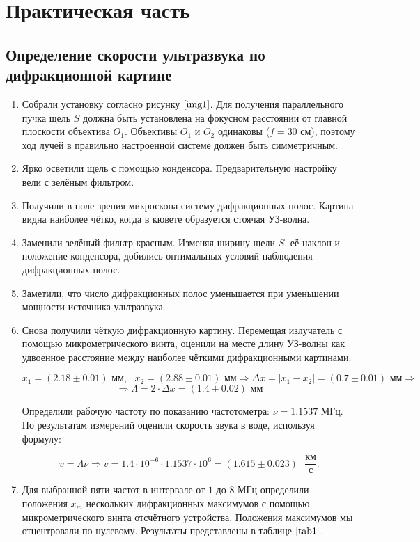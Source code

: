 \documentclass[a4paper,12pt]{article} %
\begin{document}
\section{Практическая часть}

\subsection{Определение скорости ультразвука по дифракционной картине}

\begin{enumerate}
    \item Собрали установку согласно рисунку $\ref{img1}$. Для получения параллельного пучка щель $S$ должна быть установлена на фокусном расстоянии от главной плоскости объектива $O_1$. Объективы $O_1$ и $O_2$ одинаковы ($f=30\text{ см}$), поэтому ход лучей в правильно настроенной системе должен быть симметричным.
    \item Ярко осветили щель с помощью конденсора. Предварительную настройку вели с зелёным фильтром.
    \item Получили в поле зрения микроскопа систему дифракционных полос. Картина видна наиболее чётко, когда в кювете образуется стоячая УЗ-волна.
    \item Заменили зелёный фильтр красным. Изменяя ширину щели $S$, её наклон и положение конденсора, добились оптимальных условий наблюдения дифракционных полос.
    \item Заметили, что число дифракционных полос уменьшается при уменьшении мощности источника ультразвука.
    \item Снова получили чёткую дифракционную картину. Перемещая излучатель с помощью микрометрического винта, оценили на месте длину УЗ-волны как удвоенное расстояние между наиболее чёткими дифракционными картинами.

    \[ x_1 = (2.18\pm0.01)\text{ мм}, \text{ }x_2 = (2.88\pm0.01)\text{ мм} \Rightarrow \Delta x = |x_1-x_2|=(0.7\pm0.01)\text{ мм} \Rightarrow\]
    \[ \Rightarrow \Lambda=2\cdot\Delta x=(1.4\pm0.02)\text{ мм} \]

    Определили рабочую частоту по показанию частотометра: $\nu=1.1537\text{ МГц}$. По результатам измерений оценили скорость звука в воде, используя формулу:

    \[ v=\Lambda\nu \Rightarrow v = 1.4\cdot10^{-6}\cdot1.1537\cdot10^{6}=(1.615\pm0.023)\text{ }\frac{\text{км}}{\text{с}}. \]

    \item Для выбранной пяти частот в интервале от $1$ до $8\text{ МГц}$ определили положения $x_{m}$ нескольких дифракционных максимумов с помощью микрометрического винта отсчётного устройства. Положения максимумов мы отцентровали по нулевому. Результаты представлены в таблице $\ref{tab1}$.


\end{enumerate}
\end{document}

